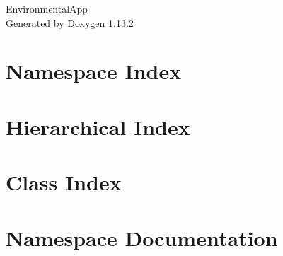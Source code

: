 \documentclass[twoside]{book}
\newcommand{\+}{\discretionary{\mbox{\scriptsize$\hookleftarrow$}}{}{}}
\newcommand{\clearemptydoublepage}{%
    \newpage{\pagestyle{empty}\cleardoublepage}%
  }
\begin{document}
  \raggedbottom
    \hypersetup{pageanchor=false,
                bookmarksnumbered=true,
                pdfencoding=unicode
               }
  \begin{titlepage}
  \vspace*{7cm}
  \begin{center}%
  {\Large Environmental\+App}\\
  \vspace*{1cm}
  {\large Generated by Doxygen 1.13.2}\\
  \end{center}
  \end{titlepage}
  \clearemptydoublepage
  \tableofcontents
  \clearemptydoublepage
  \hypersetup{pageanchor=true}
\chapter{Namespace Index}

\chapter{Hierarchical Index}

\chapter{Class Index}

\chapter{Namespace Documentation}





\end{document}
